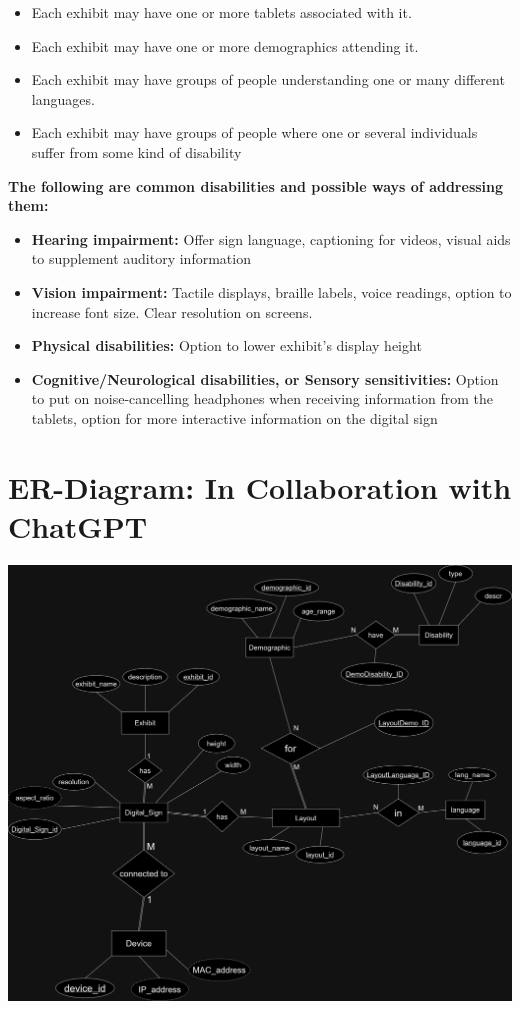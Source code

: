 \documentclass{exam}
\begin{document}
\begin{itemize}
\item Each exhibit may have one or more tablets associated with it.
\item Each exhibit may have one or more demographics attending it.
\item Each exhibit may have groups of people understanding one or many different languages.
\item Each exhibit may have groups of people where one or several individuals suffer from some kind of disability
\end{itemize}
\bigskip

\pagebreak
\textbf{\large{The following are common disabilities and possible ways of addressing them:}}\\
\begin{itemize}
\item \textbf{Hearing impairment:} Offer sign language, captioning for videos, visual aids to supplement auditory information
\item \textbf{Vision impairment:} Tactile displays, braille labels, voice readings, option to increase font size. Clear resolution on screens.
\item \textbf{Physical disabilities:} Option to lower exhibit's display height
\item \textbf{Cognitive/Neurological disabilities, or Sensory sensitivities:} Option to put on noise-cancelling headphones when receiving information from the tablets, option for more interactive information on the digital sign
\end{itemize}
\bigskip

\pagebreak
\section*{ER-Diagram: In Collaboration with ChatGPT}
\bigskip
\begin{center}
\includegraphics[scale=0.25]{science_center.png}
\end{center}
\bigskip
\end{document}
